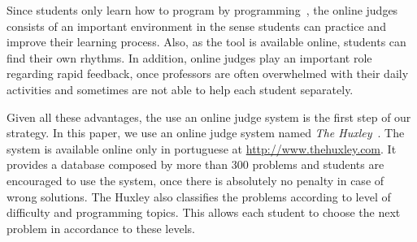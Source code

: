 Since students only learn how to program by programming~\cite{jenkins-ltsn02}, the online judges consists of an important environment in the sense students can practice and improve their learning process. Also, as the tool is available online, students can find their own rhythms. In addition, online judges play an important role regarding rapid feedback, once professors are often overwhelmed with their daily activities and sometimes are not able to help each student separately.

Given all these advantages, the use an online judge system is the first step of our strategy. In this paper, we use an online judge system named \textit{The Huxley}~\cite{paes2013ferramenta}. The system is available online only in portuguese at \url{http://www.thehuxley.com}. It provides a database composed by more than 300 problems and students are encouraged to use the system, once there is absolutely no penalty in case of wrong solutions. The Huxley also classifies the problems according to level of difficulty and programming topics. This allows each student to choose the next problem in accordance to these levels.




